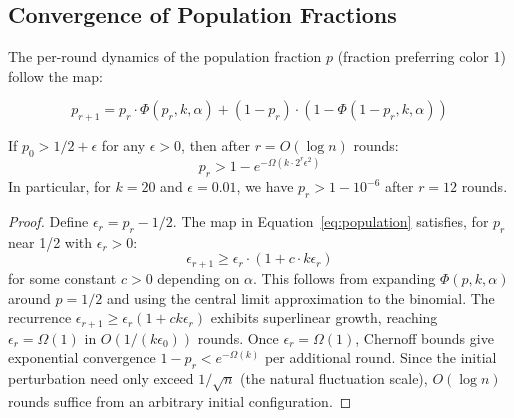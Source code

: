 \subsection{Convergence of Population Fractions}

The per-round dynamics of the population fraction $p$ (fraction preferring color 1)
follow the map:

\begin{equation}
p_{r+1} = p_r \cdot \Phi(p_r, k, \alpha) + (1 - p_r) \cdot (1 - \Phi(1 - p_r, k, \alpha))
\label{eq:population}
\end{equation}

\begin{theorem}
\label{thm:convergence}
If $p_0 > 1/2 + \epsilon$ for any $\epsilon > 0$, then after $r = O(\log n)$ rounds:
\[
p_r > 1 - e^{-\Omega(k \cdot 2^r \epsilon^2)}
\]
In particular, for $k = 20$ and $\epsilon = 0.01$, we have $p_r > 1 - 10^{-6}$ after
$r = 12$ rounds.
\end{theorem}

\begin{proof}
Define $\epsilon_r = p_r - 1/2$. The map in Equation~\ref{eq:population} satisfies, for
$p_r$ near 1/2 with $\epsilon_r > 0$:
\[
\epsilon_{r+1} \geq \epsilon_r \cdot \left(1 + c \cdot k \epsilon_r\right)
\]
for some constant $c > 0$ depending on $\alpha$. This follows from expanding $\Phi(p, k, \alpha)$
around $p = 1/2$ and using the central limit approximation to the binomial.
The recurrence $\epsilon_{r+1} \geq \epsilon_r(1 + ck\epsilon_r)$ exhibits superlinear growth,
reaching $\epsilon_r = \Omega(1)$ in $O(1/(k\epsilon_0))$ rounds. Once $\epsilon_r = \Omega(1)$,
Chernoff bounds give exponential convergence $1 - p_r < e^{-\Omega(k)}$ per additional round.
Since the initial perturbation need only exceed $1/\sqrt{n}$ (the natural fluctuation scale),
$O(\log n)$ rounds suffice from an arbitrary initial configuration.
\end{proof}

